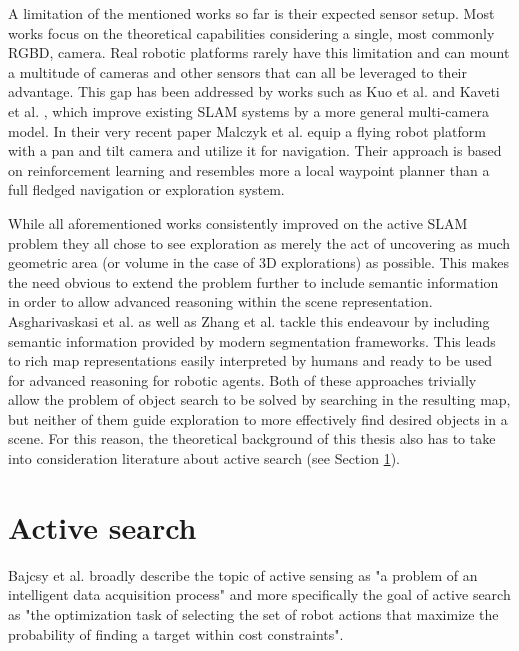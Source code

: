 \documentclass[
	parspace, %
	noindent, %
	final, %
]{elteikthesis}
\begin{document}
A limitation of the mentioned works so far is their expected sensor setup. Most works focus on the theoretical capabilities considering a single, most commonly RGBD, camera. Real robotic platforms rarely have this limitation and can mount a multitude of cameras and other sensors that can all be leveraged to their advantage. This gap has been addressed by works such as Kuo et al. \cite{redesigning_kuo_2020} and Kaveti et al. \cite{design_kaveti_2022}, which improve existing SLAM systems by a more general multi-camera model. In their very recent paper Malczyk et al. \cite{reinforcement_malczyk_2026} equip a flying robot platform with a pan and tilt camera and utilize it for navigation. Their approach is based on reinforcement learning and resembles more a local waypoint planner than a full fledged navigation or exploration system.

While all aforementioned works consistently improved on the active SLAM problem they all chose to see exploration as merely the act of uncovering as much geometric area (or volume in the case of 3D explorations) as possible. This makes the need obvious to extend the problem further to include semantic information in order to allow advanced reasoning within the scene representation. Asgharivaskasi et al. \cite{semantic_asgharivaskasi_2023} as well as Zhang et al. \cite{active_zhang_2024} tackle this endeavour by including semantic information provided by modern segmentation frameworks. This leads to rich map representations easily interpreted by humans and ready to be used for advanced reasoning for robotic agents. Both of these approaches trivially allow the problem of object search to be solved by searching in the resulting map, but neither of them guide exploration to more effectively find desired objects in a scene. For this reason, the theoretical background of this thesis also has to take into consideration literature about active search (see Section \ref{sec:lit-review-search}).

\section{Active search}
\label{sec:lit-review-search}

Bajcsy et al. \cite{revisiting_bajcsy_2018} broadly describe the topic of active sensing as "a problem of an intelligent data acquisition process" and more specifically the goal of active search as "the optimization task of selecting the set of robot actions that maximize the probability of finding a target within cost constraints". 
\end{document}

